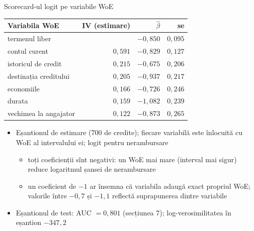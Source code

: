 \begin{frame}{Scorecard-ul logit pe variabile WoE}
\itemsize{\footnotesize}
\begin{center}
\scriptsize
\begin{tabular}{lrrr}
\toprule
Variabila WoE & IV (estimare) & $\hat\beta$ & se \\
\midrule
termenul liber & & $-0{,}850$ & $0{,}095$ \\
contul curent & $0{,}591$ & $-0{,}829$ & $0{,}127$ \\
istoricul de credit & $0{,}215$ & $-0{,}675$ & $0{,}206$ \\
destinația creditului & $0{,}205$ & $-0{,}937$ & $0{,}217$ \\
economiile & $0{,}166$ & $-0{,}726$ & $0{,}246$ \\
durata & $0{,}159$ & $-1{,}082$ & $0{,}239$ \\
vechimea la angajator & $0{,}122$ & $-0{,}873$ & $0{,}265$ \\
\bottomrule
\end{tabular}
\end{center}
\begin{itemize}
    \item Eșantionul de estimare (700 de credite); fiecare variabilă este înlocuită cu WoE al intervalului ei; logit pentru nerambursare
    \begin{itemize}
        \item toți coeficienții sînt negativi: un WoE mai mare (interval mai sigur) reduce logaritmul șansei de nerambursare
        \item un coeficient de $-1$ ar însemna că variabila adaugă exact propriul WoE; valorile între $-0{,}7$ și $-1{,}1$ reflectă suprapunerea dintre variabile
    \end{itemize}
    \item Eșantionul de test: AUC $= 0{,}801$ (secțiunea 7); log-verosimilitatea în eșantion $-347{,}2$
\end{itemize}
\end{frame}

